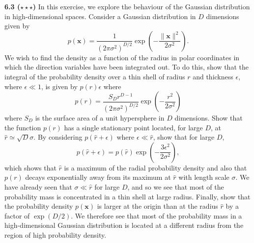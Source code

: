 \documentclass{article}
\begin{document}
\textbf{6.3 ($\star\star\star$)} In this exercise, we explore the behaviour of the Gaussian distribution in high-dimensional spaces. Consider a Gaussian distribution in $D$ dimensions given by
\begin{equation}
p(\mathbf{x}) = \frac{1}{(2\pi\sigma^2)^{D/2}} \exp\left(-\frac{\|\mathbf{x}\|^2}{2\sigma^2}\right).
\tag{6.57}
\end{equation}
We wish to find the density as a function of the radius in polar coordinates in which the direction variables have been integrated out. To do this, show that the integral of the probability density over a thin shell of radius $r$ and thickness $\epsilon$, where $\epsilon \ll 1$, is given by $p(r)\epsilon$ where
\begin{equation}
p(r) = \frac{S_D r^{D-1}}{(2\pi\sigma^2)^{D/2}} \exp\left(-\frac{r^2}{2\sigma^2}\right)
\tag{6.58}
\end{equation}
where $S_D$ is the surface area of a unit hypersphere in $D$ dimensions. Show that the function $p(r)$ has a single stationary point located, for large $D$, at $\widehat{r} \simeq \sqrt{D}\sigma$. By considering $p(\widehat{r}+\epsilon)$ where $\epsilon \ll \widehat{r}$, show that for large $D$,
\begin{equation}
p(\widehat{r}+\epsilon) = p(\widehat{r}) \exp\left(-\frac{3\epsilon^2}{2\sigma^2}\right),
\tag{6.59}
\end{equation}
which shows that $\widehat{r}$ is a maximum of the radial probability density and also that $p(r)$ decays exponentially away from its maximum at $\widehat{r}$ with length scale $\sigma$. We have already seen that $\sigma \ll \widehat{r}$ for large $D$, and so we see that most of the probability mass is concentrated in a thin shell at large radius. Finally, show that the probability density $p(\mathbf{x})$ is larger at the origin than at the radius $\widehat{r}$ by a factor of $\exp(D/2)$. We therefore see that most of the probability mass in a high-dimensional Gaussian distribution is located at a different radius from the region of high probability density.
\end{document}
